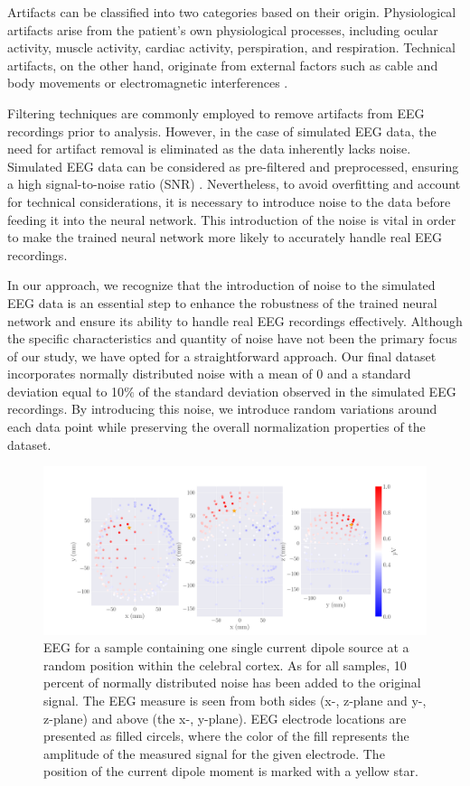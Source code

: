 \documentclass[a4paper, UKenglish, 11pt]{uiomaster}
\begin{document}
Artifacts can be classified into two categories based on their origin. Physiological artifacts arise from the patient's own physiological processes, including ocular activity, muscle activity, cardiac activity, perspiration, and respiration. Technical artifacts, on the other hand, originate from external factors such as cable and body movements or electromagnetic interferences \cite{bitbrain}.

Filtering techniques are commonly employed to remove artifacts from EEG recordings prior to analysis. However, in the case of simulated EEG data, the need for artifact removal is eliminated as the data inherently lacks noise. Simulated EEG data can be considered as pre-filtered and preprocessed, ensuring a high signal-to-noise ratio (SNR) \cite{wiki-snr}. Nevertheless, to avoid overfitting and account for technical considerations, it is necessary to introduce noise to the data before feeding it into the neural network. This introduction of the noise is vital in order to make the trained neural network more likely to accurately handle real EEG recordings.

In our approach, we recognize that the introduction of noise to the simulated EEG data is an essential step to enhance the robustness of the trained neural network and ensure its ability to handle real EEG recordings effectively. Although the specific characteristics and quantity of noise have not been the primary focus of our study, we have opted for a straightforward approach. Our final dataset incorporates normally distributed noise with a mean of 0 and a standard deviation equal to 10$\%$ of the standard deviation observed in the simulated EEG recordings. By introducing this noise, we introduce random variations around each data point while preserving the overall normalization properties of the dataset.

\begin{figure}[!htb]
    \centering
    \includegraphics[width=\linewidth]{figures/simple_dipole_eeg_field_noise_10.png}
    \caption{EEG for a sample containing one single current dipole source at a random position within the celebral cortex. As for all samples, 10 percent of normally distributed noise has been added to the original signal. The EEG measure is seen from both sides (x-, z-plane and y-, z-plane) and above (the x-, y-plane). EEG electrode locations are presented as filled circels, where the color of the fill represents the amplitude of the measured signal for the given electrode. The position of the current dipole moment is marked with a yellow star.}
    \label{fig:eeg_field_1_dipole_example}
\end{figure}
\end{document}
